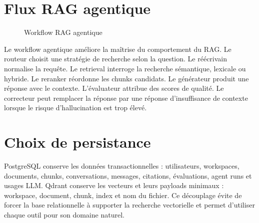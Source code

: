 \documentclass[12pt,a4paper,oneside]{report}
\begin{document}
\section{Flux RAG agentique}
\begin{figure}[H]
  \centering
  \caption{Workflow RAG agentique}
\end{figure}

Le workflow agentique améliore la maîtrise du comportement du RAG. Le routeur choisit une stratégie de recherche selon la question. Le réécrivain normalise la requête. Le retrieval interroge la recherche sémantique, lexicale ou hybride. Le reranker réordonne les chunks candidats. Le générateur produit une réponse avec le contexte. L'évaluateur attribue des scores de qualité. Le correcteur peut remplacer la réponse par une réponse d'insuffisance de contexte lorsque le risque d'hallucination est trop élevé.

\section{Choix de persistance}
PostgreSQL conserve les données transactionnelles : utilisateurs, workspaces, documents, chunks, conversations, messages, citations, évaluations, agent runs et usages LLM. Qdrant conserve les vecteurs et leurs payloads minimaux : workspace, document, chunk, index et nom du fichier. Ce découplage évite de forcer la base relationnelle à supporter la recherche vectorielle et permet d'utiliser chaque outil pour son domaine naturel.
\end{document}
